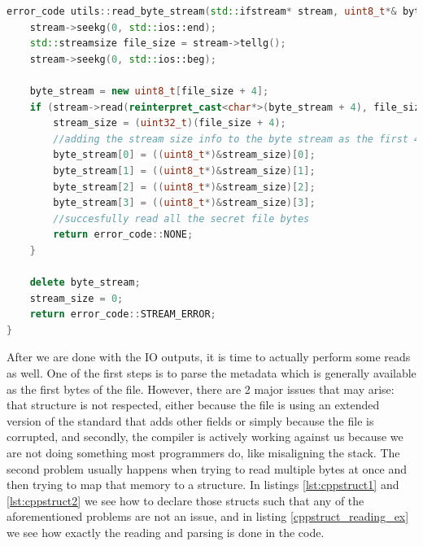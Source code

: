\begin{lstlisting}[language=C++,caption=The TRY macro used for any critical operation,label={lst:read_file_code_ex}]
error_code utils::read_byte_stream(std::ifstream* stream, uint8_t*& byte_stream, uint32_t& stream_size) {
	stream->seekg(0, std::ios::end);
	std::streamsize file_size = stream->tellg();
	stream->seekg(0, std::ios::beg);

	byte_stream = new uint8_t[file_size + 4];
	if (stream->read(reinterpret_cast<char*>(byte_stream + 4), file_size)) {
		stream_size = (uint32_t)(file_size + 4);
		//adding the stream size info to the byte stream as the first 4 bytes
		byte_stream[0] = ((uint8_t*)&stream_size)[0];
		byte_stream[1] = ((uint8_t*)&stream_size)[1];
		byte_stream[2] = ((uint8_t*)&stream_size)[2];
		byte_stream[3] = ((uint8_t*)&stream_size)[3];
		//succesfully read all the secret file bytes
		return error_code::NONE;
	}

	delete byte_stream;
	stream_size = 0;
	return error_code::STREAM_ERROR;
}
\end{lstlisting}


After we are done with the IO outputs, it is time to actually perform some reads as well. One of the first steps is to parse the metadata which is generally available as the first bytes of the file. However, there are 2 major issues that may arise: that structure is not respected, either because the file is using an extended version of the standard that adds other fields or simply because the file is corrupted, and secondly, the compiler is actively working against us because we are not doing something most programmers do, like misaligning the stack. The second problem usually happens when trying to read multiple bytes at once and then trying to map that memory to a structure. In listings \ref{lst:cppstruct1} and \ref{lst:cppstruct2} we see how to declare those structs such that any of the aforementioned problems are not an issue, and in listing \ref{cppstruct_reading_ex} we see how exactly the reading and parsing is done in the code.

